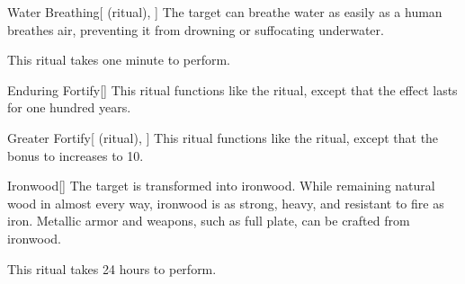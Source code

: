 \lowercase{\hypertarget{spell:Water Breathing}{}}\label{spell:Water Breathing}
\begin{attuneability}[Rank 3]{\hypertarget{spell:Water Breathing}{Water Breathing}}[ (ritual), ]
The target can breathe water as easily as a human breathes air, preventing it from drowning or suffocating underwater.

This ritual takes one minute to perform.
\end{attuneability}
\vspace{0.25em}



\lowercase{\hypertarget{spell:Enduring Fortify}{}}\label{spell:Enduring Fortify}
\begin{apability}[Rank 4]{\hypertarget{spell:Enduring Fortify}{Enduring Fortify}}[]
This ritual functions like the  ritual, except that the effect lasts for one hundred years.
\end{apability}
\vspace{0.25em}



\lowercase{\hypertarget{spell:Greater Fortify}{}}\label{spell:Greater Fortify}
\begin{attuneability}[Rank 4]{\hypertarget{spell:Greater Fortify}{Greater Fortify}}[ (ritual), ]
This ritual functions like the  ritual, except that the bonus to  increases to 10.
\end{attuneability}
\vspace{0.25em}



\lowercase{\hypertarget{spell:Ironwood}{}}\label{spell:Ironwood}
\begin{apability}[Rank 4]{\hypertarget{spell:Ironwood}{Ironwood}}[]
The target is transformed into ironwood.
While remaining natural wood in almost every way, ironwood is as strong, heavy, and resistant to fire as iron.
Metallic armor and weapons, such as full plate, can be crafted from ironwood.

This ritual takes 24 hours to perform.
\end{apability}
\vspace{0.25em}




